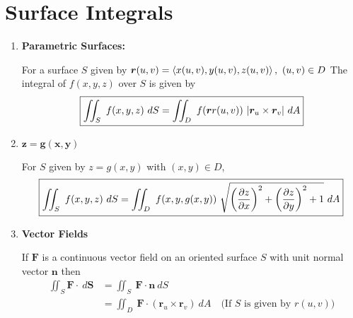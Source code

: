 \documentclass[12pt]{exam}
\newcommand{\qdate}{Surface Integrals} %
\begin{document}
\section*{\qdate}


\begin{enumerate}
    \item \textbf{Parametric Surfaces:}

        For a surface \(S\) given by
        \(
            \bm{r}(u,v)=\left\langle x(u,v),y(u,v),z(u,v) \right\rangle,~(u,v)\in D
        \)
        The integral of \(f(x,y,z)\) over \(S\) is given by
        \[
            \boxed{\iint_S~f(x,y,z)~dS = \iint_{D}~f(\bm{r}{r}(u,v))~|\bm{r}_u\times \bm{r}_v|~dA}
        \]
    \item \(\bm{z=g(x,y)}\)

        For \(S\) given by \(z=g(x,y)\) with \((x,y)\in D\), 
        \[
            \boxed{\iint_S~f(x,y,z)~dS = \iint_D~f(x,y,g(x,y))~\sqrt{ \left(\dfrac{\partial z}{\partial x}\right)^2+\left(\dfrac{\partial z}{\partial y}\right)^2+1}~dA}
        \]
    \item \textbf{Vector Fields}

        If \(\bm{F}\) is a continuous vector field on an oriented surface \(S\) with unit normal vector \(\bm{n}\) then 
        \begin{align*}
        \iint_S\bm{F}\cdot~d\bm{S} & = \iint_S~\bm{F}\cdot \bm{n}~dS\\
            & = \iint_{D}~\bm{F}\cdot\left(\bm{r}_u\times\bm{r}_v\right)~dA \quad \text{(If $S$ is given by \(r(u,v)\))}
        \end{align*}
            
    
\end{enumerate}

~
\end{document}

